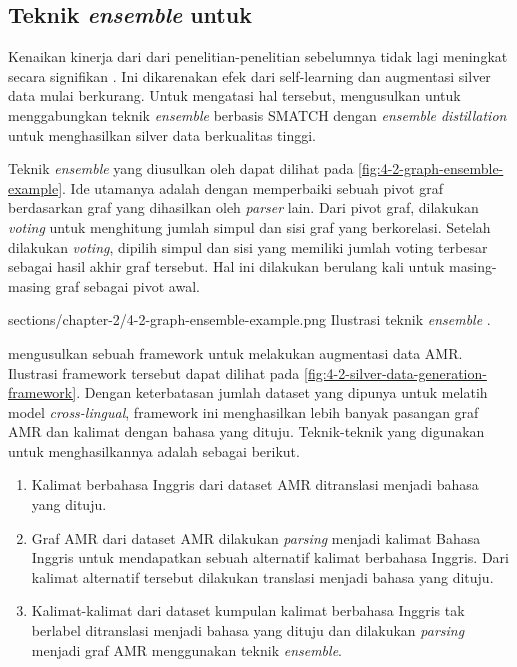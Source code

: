 \subsection{Teknik \textit{ensemble} untuk \amrparsing{}}

Kenaikan kinerja dari \amrparsing{} dari penelitian-penelitian sebelumnya tidak lagi meningkat secara signifikan .
Ini dikarenakan efek dari self-learning dan augmentasi silver data mulai berkurang.
Untuk mengatasi hal tersebut, \textcite{lee2022} mengusulkan untuk menggabungkan teknik \textit{ensemble} berbasis \gls{SMATCH}  dengan \textit{ensemble distillation} untuk menghasilkan silver data berkualitas tinggi.

Teknik \textit{ensemble} yang diusulkan oleh \textcite{hoang2021} dapat dilihat pada \cref{fig:4-2-graph-ensemble-example}.
Ide utamanya adalah dengan memperbaiki sebuah pivot graf berdasarkan graf yang dihasilkan oleh \textit{parser} lain.
Dari pivot graf, dilakukan \textit{voting} untuk menghitung jumlah simpul dan sisi graf yang berkorelasi.
Setelah dilakukan \textit{voting}, dipilih simpul dan sisi yang memiliki jumlah voting terbesar sebagai hasil akhir graf tersebut.
Hal ini dilakukan berulang kali untuk masing-masing graf sebagai pivot awal.

  {sections/chapter-2/4-2-graph-ensemble-example.png}
  {Ilustrasi teknik \textit{ensemble} .}

\textcite{lee2022} mengusulkan sebuah framework untuk melakukan augmentasi data \gls{AMR}.
Ilustrasi framework tersebut dapat dilihat pada \cref{fig:4-2-silver-data-generation-framework}.
Dengan keterbatasan jumlah dataset yang dipunya untuk melatih model \textit{cross-lingual}, framework ini menghasilkan lebih banyak pasangan graf \gls{AMR} dan kalimat dengan bahasa yang dituju.
Teknik-teknik yang digunakan untuk menghasilkannya adalah sebagai berikut.
\begin{enumerate}
  \item Kalimat berbahasa Inggris dari dataset \gls{AMR} ditranslasi menjadi bahasa yang dituju.

  \item Graf \gls{AMR} dari dataset \gls{AMR} dilakukan \textit{parsing} menjadi kalimat Bahasa Inggris untuk mendapatkan sebuah alternatif kalimat berbahasa Inggris.
  Dari kalimat alternatif tersebut dilakukan translasi menjadi bahasa yang dituju.

  \item Kalimat-kalimat dari dataset kumpulan kalimat berbahasa Inggris tak berlabel ditranslasi menjadi bahasa yang dituju dan dilakukan \textit{parsing} menjadi graf \gls{AMR} menggunakan teknik \textit{ensemble}.
\end{enumerate}

